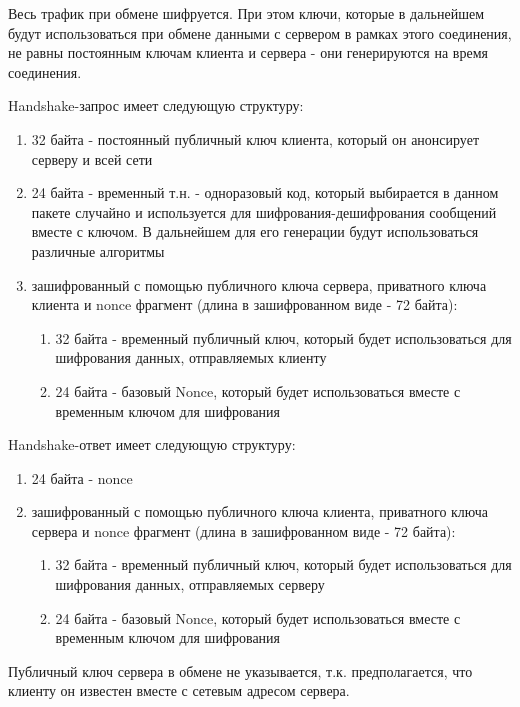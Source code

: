 \documentclass{/home/fresheed/utils/latex/university-templates/lab-report}
\begin{document}
Весь трафик при обмене шифруется. При этом ключи, которые в дальнейшем будут использоваться при обмене данными с сервером в рамках этого соединения, не равны постоянным ключам клиента и сервера - они генерируются на время соединения.

Handshake-запрос имеет следующую структуру:

\begin{enumerate}
\item 32 байта - постоянный публичный ключ клиента, который он анонсирует серверу и всей сети
\item 24 байта - временный т.н.  - одноразовый код, который выбирается в данном пакете случайно и используется для шифрования-дешифрования сообщений вместе с ключом. В дальнейшем для его генерации будут использоваться различные алгоритмы
\item зашифрованный с помощью публичного ключа сервера, приватного ключа клиента и nonce фрагмент (длина в зашифрованном виде - 72 байта):
  \begin{enumerate}
  \item 32 байта - временный публичный ключ, который будет использоваться для шифрования данных, отправляемых клиенту
  \item 24 байта - базовый Nonce, который будет использоваться вместе с временным ключом для шифрования
  \end{enumerate}
\end{enumerate}

Handshake-ответ имеет следующую структуру:

\begin{enumerate}
\item 24 байта -  nonce
\item зашифрованный с помощью публичного ключа клиента, приватного ключа сервера и nonce фрагмент (длина в зашифрованном виде - 72 байта):
  \begin{enumerate}
  \item 32 байта - временный публичный ключ, который будет использоваться для шифрования данных, отправляемых серверу
  \item 24 байта - базовый Nonce, который будет использоваться вместе с временным ключом для шифрования
  \end{enumerate}
\end{enumerate}

Публичный ключ сервера в обмене не указывается, т.к. предполагается, что клиенту он известен вместе с сетевым адресом сервера.
\end{document}
